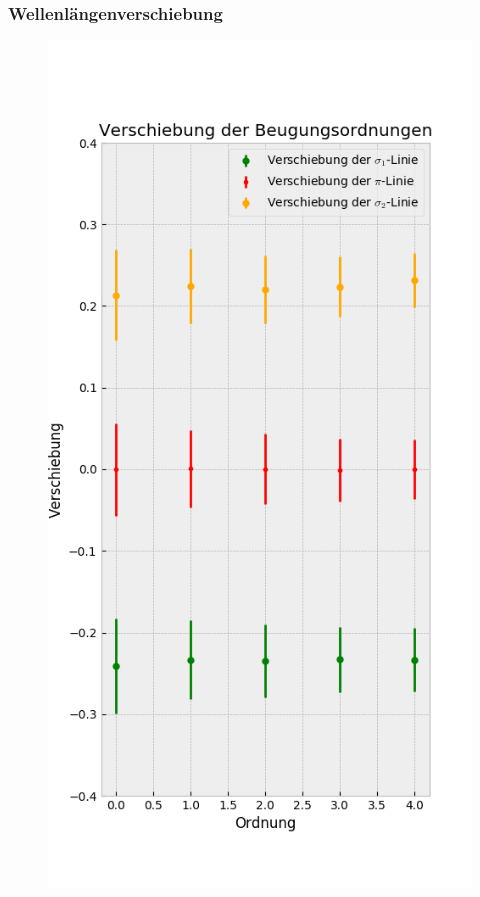     \subsubsection{Wellenlängenverschiebung}
      \begin{myframe}{}
          \begin{figure}
              \centering
              \includegraphics[height=.85\paperheight]{img/diff_sco10A}

\end{figure}
\end{myframe}
